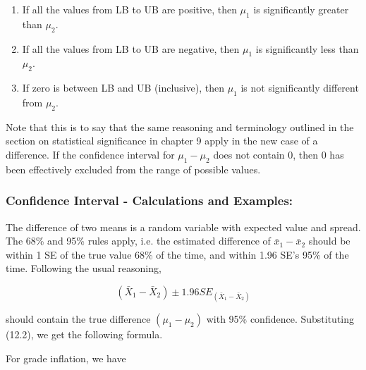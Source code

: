 \documentclass[11pt, chapterprefix=true]{scrbook}\usepackage[]{graphicx}\usepackage[]{color}
\begin{document}
\begin{enumerate}
  \item If all the values from LB to UB are positive, then 
  $\mu_1$ is significantly greater than $\mu_2$.

  \item If all the values from LB to UB are negative, then $\mu_1$ is significantly less than $\mu_2$. 

  \item If zero is between LB and UB (inclusive), then $\mu_1$ is not significantly different from $\mu_2$.
\end{enumerate}

Note that this is to say that the same reasoning and terminology outlined in the section on statistical significance in chapter 9 apply in the new case of a difference.  If the confidence interval for $\mu_1 - \mu_2$ does not contain 0, then 0 has been effectively excluded from the range of possible values.


\subsubsection{Confidence Interval - Calculations and Examples:}

The difference of two means is a random variable with expected value and spread.  The 68\% and 95\% rules apply, i.e. the estimated difference of $\bar{x}_1 - \bar{x}_2$ should be within 1 SE of the true value 68\% of the time, and within 1.96 SE's 95\% of the time.  Following the usual reasoning,    

\begin{equation*}
(\bar{X}_1 - \bar{X}_2) \pm 1.96 SE_{(\bar{X}_1 - \bar{X}_2)}
\end{equation*}

should contain the true difference $(\mu_1 - \mu_2)$ with 95\% confidence.  Substituting (12.2), we get the following formula.


For grade inflation, we have
\end{document}
